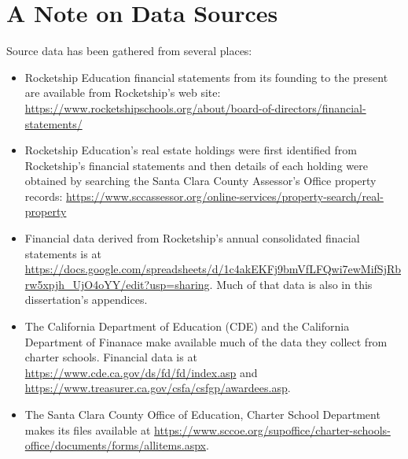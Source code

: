 
\chapter{A Note on Data Sources}\label{ch:Note_on_Sources}\noindent%


Source data has been gathered from several places:
\begin{itemize}
  \item Rocketship Education financial statements from its founding to the present are available from Rocketship's web site: \url{https://www.rocketshipschools.org/about/board-of-directors/financial-statements/}
  \item Rocketship Education's real estate holdings were first identified from Rocketship's financial statements and then details of each holding were obtained by searching the Santa Clara County Assessor's Office property records: \url{https://www.sccassessor.org/online-services/property-search/real-property}
  \item Financial data derived from Rocketship's annual consolidated finacial statements is at \url{https://docs.google.com/spreadsheets/d/1c4akEKFj9bmVfLFQwi7ewMifSjRbrw5xpjh_UjO4oYY/edit?usp=sharing}. Much of that data is also in this dissertation's appendices.
  \item The California Department of Education (CDE) and the California Department of Finanace make available much of the data they collect from charter schools. Financial data is at \url{https://www.cde.ca.gov/ds/fd/fd/index.asp} and \url{https://www.treasurer.ca.gov/csfa/csfgp/awardees.asp}.
  \item The Santa Clara County Office of Education, Charter School Department makes its files available at \url{https://www.sccoe.org/supoffice/charter-schools-office/documents/forms/allitems.aspx}.
\end{itemize}

